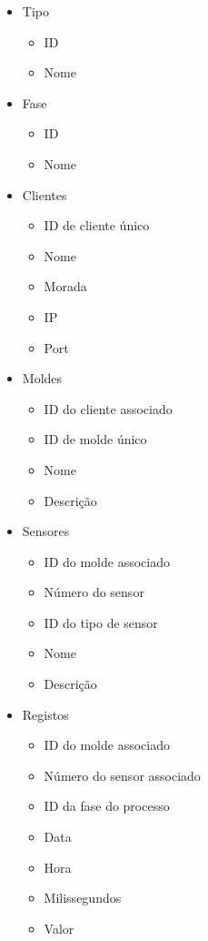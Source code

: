 \documentclass[11pt,twoside,a4paper]{report}
\begin{document}
\begin{itemize}[noitemsep]
	\item Tipo
	\begin{itemize}[noitemsep]
		\item ID
		\item Nome
	\end{itemize}
	\item Fase
	\begin{itemize}[noitemsep]
		\item ID
		\item Nome
	\end{itemize}
	\item Clientes
	\begin{itemize}[noitemsep]
		\item ID de cliente único
		\item Nome
		\item Morada
		\item IP
		\item Port
	\end{itemize}
	\item Moldes
	\begin{itemize}[noitemsep]
		\item ID do cliente associado
		\item ID de molde único
		\item Nome
		\item Descrição
	\end{itemize}
	\item Sensores
	\begin{itemize}[noitemsep]
		\item ID do molde associado
		\item Número do sensor
		\item ID do tipo de sensor
		\item Nome
		\item Descrição
	\end{itemize}
	\item Registos
	\begin{itemize}[noitemsep]
		\item ID do molde associado
		\item Número do sensor associado
		\item ID da fase do processo
		\item Data
		\item Hora
		\item Milissegundos
		\item Valor
	\end{itemize}
\end{itemize}
\end{document}
